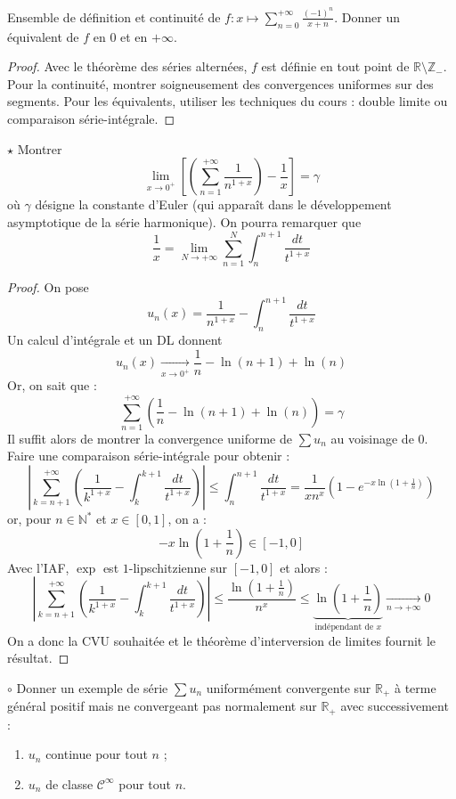 \documentclass[french,a4paper]{article}
\newcommand{\N}{\mathbb{N}}
\newcommand{\Z}{\mathbb{Z}}
\newcommand{\R}{\mathbb{R}}
\newcommand{\st}{^*}
\theoremstyle{plain}
\theoremstyle{definition}
\theoremstyle{remark}
\begin{document}
\begin{ex}{}
	Ensemble de définition et continuité de $f:x\mapsto\displaystyle\sum_{n=0}^{+\infty}\frac{(-1)^n}{x+n}$. Donner un équivalent de $f$ en $0$ et en $+\infty$.
\end{ex}
\begin{proof}
	Avec le théorème des séries alternées, $f$ est définie en tout point de $\R\setminus\Z_-$. Pour la continuité, montrer soigneusement des convergences uniformes sur des segments. Pour les équivalents, utiliser les techniques du cours : double limite ou comparaison série-intégrale.
\end{proof}

\begin{ex}{$\star$}
	Montrer $$\lim_{x\to 0^+}\left[\left(\sum_{n=1}^{+\infty}\frac{1}{n^{1+x}}\right)-\frac{1}{x}\right]=\gamma$$ où $\gamma$ désigne la constante d'Euler (qui apparaît dans le développement asymptotique de la série harmonique). On pourra remarquer que $$\frac{1}{x}=\lim_{N\to+\infty}\sum_{n=1}^{N}\int_{n}^{n+1}\frac{dt}{t^{1+x}}$$
\end{ex}
\begin{proof}
	On pose $$u_n(x)=\frac{1}{n^{1+x}}-\int_{n}^{n+1}\frac{dt}{t^{1+x}}$$ Un calcul d'intégrale et un DL donnent $$u_n(x)\xrightarrow[x\to 0^+]{}\frac{1}{n}-\ln(n+1)+\ln(n)$$ Or, on sait que : $$\sum_{n=1}^{+\infty}\left(\frac{1}{n}-\ln(n+1)+\ln(n)\right)=\gamma$$ Il suffit alors de montrer la convergence uniforme de $\sum u_n$ au voisinage de $0$. Faire une comparaison série-intégrale pour obtenir : $$\left\lvert\sum_{k=n+1}^{+\infty}\left(\frac{1}{k^{1+x}}-\int_{k}^{k+1}\frac{dt}{t^{1+x}}\right)\right\rvert\leqslant\int_{n}^{n+1}\frac{dt}{t^{1+x}}=\frac{1}{xn^x}\left(1-e^{-x\ln\left(1+\frac{1}{n}\right)}\right)$$ or, pour $n\in\N\st$ et $x\in[0,1]$, on a : $$-x\ln\left(1+\frac{1}{n}\right)\in[-1,0]$$ Avec l'IAF, $\exp$ est $1$-lipschitzienne sur $[-1,0]$ et alors : $$\left\lvert\sum_{k=n+1}^{+\infty}\left(\frac{1}{k^{1+x}}-\int_{k}^{k+1}\frac{dt}{t^{1+x}}\right)\right\rvert\leqslant\frac{\ln\left(1+\frac{1}{n}\right)}{n^x}\leqslant\underbrace{\ln\left(1+\frac{1}{n}\right)}_{\text{indépendant de }x}\xrightarrow[n\to+\infty]{}0$$ On a donc la CVU souhaitée et le théorème d'interversion de limites fournit le résultat.
\end{proof}

\begin{ex}{$\circ$}
	Donner un exemple de série $\sum u_n$ uniformément convergente sur $\R_+$ à terme général positif mais ne convergeant pas normalement sur $\R_+$ avec successivement :
	\begin{enumerate}
		\item $u_n$ continue pour tout $n$ ;
		\item $u_n$ de classe $\mathcal{C}^\infty$ pour tout $n$.
	\end{enumerate}
\end{ex}
\end{document}
